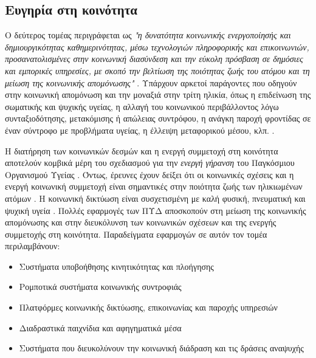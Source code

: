 \subsection{Ευγηρία στη κοινότητα}

Ο δεύτερος τομέας περιγράφεται ως \textit{"η δυνατότητα κοινωνικής ενεργοποίησής και δημιουργικότητας καθημερινότητας, μέσω τεχνολογιών πληροφορικής και επικοινωνιών, προσανατολισμένες στην κοινωνική διασύνδεση και την εύκολη πρόσβαση σε δημόσιες και εμπορικές υπηρεσίες, με σκοπό την βελτίωση της ποιότητας ζωής του ατόμου και τη μείωση της κοινωνικής απομόνωσης"} \cite{broek}.
Υπάρχουν αρκετοί παράγοντες που οδηγούν στην κοινωνική απομόνωση και την μοναξιά στην τρίτη ηλικία, όπως η επιδείνωση της σωματικής και ψυχικής υγείας, η αλλαγή του κοινωνικού περιβάλλοντος λόγω συνταξιοδότησης, μετακόμισης ή απώλειας συντρόφου, η ανάγκη παροχή φροντίδας σε έναν σύντροφο με προβλήματα υγείας, η έλλειψη μεταφορικού μέσου, κλπ. \cite{Wherton2009}.
\par
Η διατήρηση των κοινωνικών δεσμών και η ενεργή συμμετοχή στη κοινότητα αποτελούν κομβικά μέρη του σχεδιασμού για την \textit{ενεργή γήρανση} του Παγκόσμιου Οργανισμού Υγείας \cite{WHO2015}.
Όντως, έρευνες έχουν δείξει ότι οι κοινωνικές σχέσεις και η ενεργή κοινωνική συμμετοχή είναι σημαντικές στην ποιότητα ζωής των ηλικιωμένων ατόμων \cite{Bowling2003}\cite{GABRIEL2004}.
Η κοινωνική δικτύωση είναι συσχετισμένη με καλή φυσική, πνευματική και ψυχική υγεία \cite{Luanaigh2008}\cite{Shankar2011}\cite{Thurston2009}.
Πολλές εφαρμογές των ΠΥΔ αποσκοπούν στη μείωση της κοινωνικής απομόνωσης και στην διευκόλυνση των κοινωνικών σχέσεων και της ενεργής συμμετοχής στη κοινότητα.
Παραδείγματα εφαρμογών σε αυτόν τον τομέα περιλαμβάνουν:
\begin{itemize}
    \item Συστήματα υποβοήθησης κινητικότητας και πλοήγησης
    \item Ρομποτικά συστήματα κοινωνικής συντροφιάς
    \item Πλατφόρμες κοινωνικής δικτύωσης, επικοινωνίας και παροχής υπηρεσιών
    \item Διαδραστικά παιχνίδια και αφηγηματικά μέσα
    \item Συστήματα που διευκολύνουν την κοινωνική διάδραση και τις δράσεις αναψυχής
\end{itemize}{}


